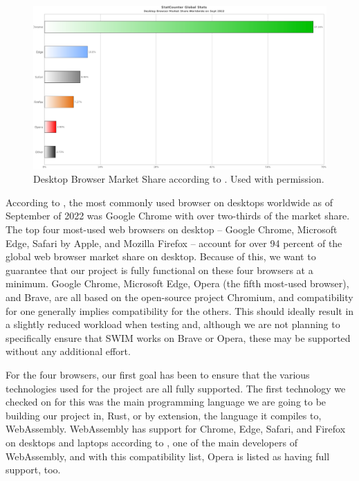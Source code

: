\documentclass[
    paper=letter,
    parskip=half,
    fontsize=12pt,
    titlepage=firstiscover,
    toc=bibliography,
    numbers=endperiod
]{scrartcl}
\begin{document}
\begin{figure}[H]
    \includegraphics[width=\textwidth]{browser-global-stats}
    \caption{Desktop Browser Market Share according to \protect\cite{statcounter}. Used with
    permission.}
\end{figure}

According to \cite{statcounter}, the most commonly used browser on
desktops worldwide as of September of 2022 was Google Chrome with over
two-thirds of the market share. The top four most-used web browsers on
desktop -- Google Chrome, Microsoft Edge, Safari by Apple, and Mozilla
Firefox -- account for over 94 percent of the global web browser market
share on desktop. Because of this, we want to guarantee that our project
is fully functional on these four browsers at a minimum. Google Chrome,
Microsoft Edge, Opera (the fifth most-used browser), and Brave, are all
based on the open-source project Chromium, and compatibility for one
generally implies compatibility for the others. This should ideally
result in a slightly reduced workload when testing and, although we are
not planning to specifically ensure that SWIM works on Brave or Opera,
these may be supported without any additional effort.

For the four browsers, our first goal has been to ensure that the
various technologies used for the project are all fully supported. The
first technology we checked on for this was the main programming
language we are going to be building our project in, Rust, or by
extension, the language it compiles to, WebAssembly. WebAssembly has
support for Chrome, Edge, Safari, and Firefox on desktops and laptops
according to \cite{mdn-webassembly}, one of the main developers of
WebAssembly, and with this compatibility list, Opera is listed as having
full support, too.
\end{document}
